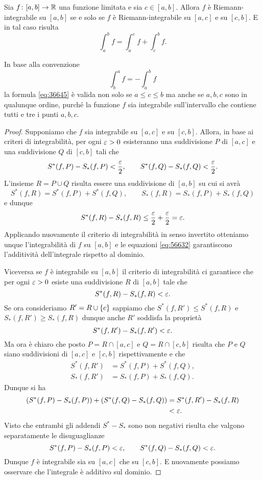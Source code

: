 \begin{theorem}
\mymark{*}
\label{th:additivita_integrale}
Sia $f\colon [a,b]\to \mathbb R$ una funzione limitata e sia $c\in [a,b]$.
Allora $f$ è Riemann-integrabile su $[a,b]$ se e solo se
$f$ è Riemann-integrabile su $[a,c]$ e su $[c,b]$.
E in tal caso risulta
\begin{equation}\label{eq:36645}
 \int_a^b f = \int_a^c f + \int_c^b f.
\end{equation}

In base alla convenzione
\[
   \int_b^a f = -\int_a^b f
\]
la formula \eqref{eq:36645} è valida non solo se $a\le c\le b$ ma anche
se $a,b,c$ sono in qualunque ordine, purché la funzione $f$ sia integrabile
sull'intervallo che contiene tutti e tre i punti $a,b,c$.
\end{theorem}
%
\begin{proof}
\mymark{*}
Supponiamo che $f$ sia integrabile su $[a,c]$ e su $[c,b]$.
Allora, in base ai criteri di integrabilità, per ogni $\varepsilon>0$ esisteranno una
suddivisione $P$ di $[a,c]$ e una suddivisione $Q$ di $[c,b]$ tali che
\[
  S^*(f,P) - S_*(f,P) < \frac {\varepsilon} 2,
  \qquad
  S^*(f,Q) - S_*(f,Q) < \frac {\varepsilon} 2.
\]
L'insieme $R=P\cup Q$ risulta essere una suddivisione di $[a,b]$ su cui si avrà
\begin{equation}\label{eq:56632}
S^*(f,R) = S^*(f,P) + S^*(f,Q), \qquad
S_*(f,R) = S_*(f,P) + S_*(f,Q)
\end{equation}
e dunque
\[
S^*(f,R) - S_*(f,R) \le \frac {\varepsilon} 2 + \frac {\varepsilon} 2 = \varepsilon.
\]
Applicando nuovamente il criterio di integrabilità in senso invertito otteniamo
unque l'integrabilità di $f$ su $[a,b]$ e le equazioni
\eqref{eq:56632} garantiscono l'additività dell'integrale rispetto al dominio.

Viceversa se $f$ è integrabile su $[a,b]$ il criterio di integrabilità
ci garantisce che per ogni $\varepsilon>0$ esiste una suddivisione $R$ di $[a,b]$ tale che
\[
S^*(f,R) - S_*(f,R) < \varepsilon.
\]
Se ora consideriamo $R' = R \cup {\left\{ c \right\}}$ sappiamo che $S^*(f,R') \le S^*(f,R)$
e $S_*(f,R') \ge S_*(f,R)$ dunque anche $R'$ soddisfa la proprietà
\[
S^*(f,R') - S_*(f,R') < \varepsilon.
\]
Ma ora è chiaro che posto $P=R \cap[a,c]$ e $Q=R\cap[c,b]$ risulta che $P$
e $Q$ siano suddivisioni di $[a,c]$ e $[c,b]$ rispettivamente e che
\begin{align*}
  S^*(f,R') &= S^*(f,P) + S^*(f,Q), \\
  S_*(f,R') &= S_*(f,P) + S_*(f,Q).
\end{align*}
Dunque si ha
\begin{align*}
(S^*(f,P) - S_*(f,P)) + (S^*(f,Q) - S_*(f,Q))
&= S^*(f,R') - S_*(f,R) \\
&< \varepsilon.
\end{align*}
Visto che entrambi gli addendi $S^*-S_*$ sono non negativi
risulta che valgono separatamente le disuguaglianze
\[
S^*(f,P) - S_*(f,P) < \varepsilon, \qquad
S^*(f,Q) - S_*(f,Q) < \varepsilon.
\]
Dunque $f$ è integrabile sia su $[a,c]$ che su $[c,b]$.
E nuovamente possiamo osservare che l'integrale è additivo sul dominio.
\end{proof}

